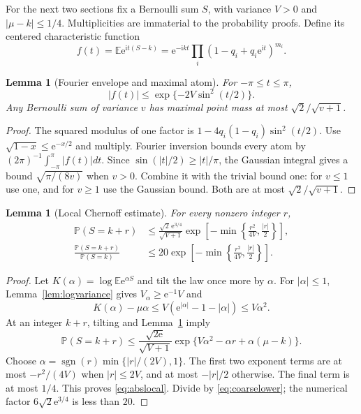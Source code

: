 \documentclass[11pt,a4paper]{article}
\newtheorem{lemma}[theorem]{Lemma}
\theoremstyle{definition}
\newcommand{\E}{\mathbb E}
\newcommand{\Prob}{\mathbb P}
\newcommand{\ii}{\mathrm i}
\newcommand{\ee}{\mathrm e}
\newcommand{\abs}[1]{\left|#1\right|}
\begin{document}
For the next two sections fix a Bernoulli sum $S$, with variance $V>0$ and $\abs{\mu-k}\le1/4$. Multiplicities are immaterial to the probability proofs. Define its centered characteristic function
\begin{equation}\label{eq:char}
 f(t)=\E\ee^{\ii t(S-k)}
 =\ee^{-\ii kt}\prod_i(1-q_i+q_i\ee^{\ii t})^{m_i}.
\end{equation}

\begin{lemma}[Fourier envelope and maximal atom]\label{lem:envelope}
For $-\pi\le t\le\pi$,
\begin{equation}\label{eq:envelope}
 \abs{f(t)}\le\exp\{-2V\sin^2(t/2)\}.
\end{equation}
Any Bernoulli sum of variance $v$ has maximal point mass at most
$\sqrt2/\sqrt{v+1}$.
\end{lemma}
\begin{proof}
The squared modulus of one factor is
$1-4q_i(1-q_i)\sin^2(t/2)$.
Use $\sqrt{1-x}\le\ee^{-x/2}$ and multiply. Fourier inversion bounds every atom by $(2\pi)^{-1}\int_{-\pi}^{\pi}\abs{f(t)}dt$. Since $\sin(\abs t/2)\ge\abs t/\pi$, the Gaussian integral gives a bound $\sqrt{\pi/(8v)}$ when $v>0$. Combine it with the trivial bound one: for $v\le1$ use one, and for $v\ge1$ use the Gaussian bound. Both are at most $\sqrt2/\sqrt{v+1}$.
\end{proof}

\begin{lemma}[Local Chernoff estimate]\label{lem:localchernoff}
For every nonzero integer $r$,
\begin{align}
 \Prob(S=k+r)
 &\le \frac{\sqrt2\,\ee^{3/4}}{\sqrt{V+1}}
 \exp\!\left[-\min\left\{\frac{r^2}{4V},\frac{\abs r}{2}\right\}\right],
 \label{eq:abslocal}\\
 \frac{\Prob(S=k+r)}{\Prob(S=k)}
 &\le20\exp\!\left[-\min\left\{\frac{r^2}{4V},\frac{\abs r}{2}\right\}\right].
 \label{eq:rellocal}
\end{align}
\end{lemma}
\begin{proof}
Let $K(\alpha)=\log\E\ee^{\alpha S}$ and tilt the law once more by $\alpha$. For $\abs\alpha\le1$, Lemma~\ref{lem:logvariance} gives $V_\alpha\ge\ee^{-1}V$ and
\[
 K(\alpha)-\mu\alpha
 \le V(\ee^{\abs\alpha}-1-\abs\alpha)\le V\alpha^2.
\]
At an integer $k+r$, tilting and Lemma~\ref{lem:envelope} imply
\[
 \Prob(S=k+r)
 \le\frac{\sqrt{2\ee}}{\sqrt{V+1}}
 \exp\{V\alpha^2-\alpha r+\alpha(\mu-k)\}.
\]
Choose $\alpha=\operatorname{sgn}(r)\min\{\abs r/(2V),1\}$. The first two exponent terms are at most $-r^2/(4V)$ when $\abs r\le2V$, and at most $-\abs r/2$ otherwise. The final term is at most $1/4$. This proves \eqref{eq:abslocal}. Divide by \eqref{eq:coarselower}; the numerical factor $6\sqrt2\ee^{3/4}$ is less than $20$.
\end{proof}
\end{document}
